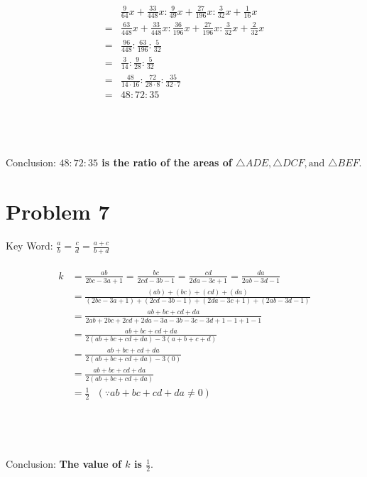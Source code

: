 \documentclass[12pt]{report}
\begin{document}
\begin{align*}
    &\frac{9}{64}x+\frac{33}{448}x:\frac{9}{49}x+\frac{27}{196}x:\frac{3}{32}x+\frac{1}{16}x \\
    =& \frac{63}{448}x+\frac{33}{448}x:\frac{36}{196}x+\frac{27}{196}x:\frac{3}{32}x+\frac{2}{32}x \\
    =& \frac{96}{448}:\frac{63}{196}:\frac{5}{32} \\
    =& \frac{3}{14}:\frac{9}{28}:\frac{5}{32} \\
    =& \frac{48}{14\cdot16}:\frac{72}{28\cdot8}:\frac{35}{32\cdot7} \\
    =& 48:72:35
\end{align*}
\\\\
\\\\
Conclusion: \textbf{$48:72:35$ is the ratio of the areas of $\triangle ADE, \triangle DCF, \text{and } \triangle BEF$}.


\chapter*{Problem 7}

\noindent
Key Word: $\frac{a}{b}=\frac{c}{d}=\frac{a+c}{b+d}$
\\\\
\begin{align*}
    k&=\frac{ab}{2bc-3a+1}=\frac{bc}{2cd-3b-1}=\frac{cd}{2da-3c+1}=\frac{da}{2ab-3d-1} \\
    &=\frac{(ab)+(bc)+(cd)+(da)}{(2bc-3a+1)+(2cd-3b-1)+(2da-3c+1)+(2ab-3d-1)} \\
    &=\frac{ab+bc+cd+da}{2ab+2bc+2cd+2da-3a-3b-3c-3d+1-1+1-1} \\
    &=\frac{ab+bc+cd+da}{2(ab+bc+cd+da)-3(a+b+c+d)} \\
    &=\frac{ab+bc+cd+da}{2(ab+bc+cd+da)-3(0)} \\
    &=\frac{ab+bc+cd+da}{2(ab+bc+cd+da)} \\
    &=\frac{1}{2} \text{ } (\because ab+bc+cd+da\ne0)
\end{align*}
\\\\
\\\\
Conclusion: \textbf{The value of $k$ is $\frac{1}{2}$}.
\end{document}
